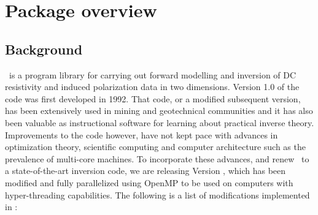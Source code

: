 \section{Package overview}
\subsection{Background}
\prog~is a program library for carrying out forward modelling and inversion of DC resistivity and induced polarization data in two dimensions. Version 1.0 of the code was first developed in 1992. That code, or a modified subsequent version, has been extensively used in mining and geotechnical communities and it has also been valuable as instructional software for learning about practical inverse theory. Improvements to the code however, have not kept pace with advances in optimization theory, scientific computing and computer architecture such as the prevalence of multi-core machines. To incorporate these advances, and renew \prog~to a state-of-the-art inversion code, we are releasing Version \version, which has been modified and fully parallelized using OpenMP to be used on computers with hyper-threading capabilities. The following is a list of modifications implemented in \programName:


